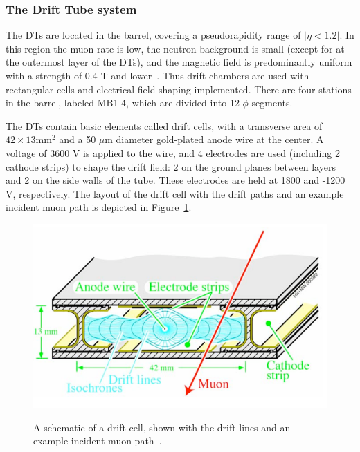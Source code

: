 \subsubsection{The Drift Tube system}
\label{dts}

The DTs are located in the barrel, covering a pseudorapidity range of $|\eta < 1.2|$.  In this region the muon rate is low, the neutron background is small (except for at the outermost layer of the DTs), and the magnetic field is predominantly uniform with a strength of 0.4 T and lower~\cite{CMSperformance}.  Thus drift chambers are used with rectangular cells and electrical field shaping implemented.  There are four stations in the barrel, labeled MB1-4, which are divided into 12 $\phi$-segments.  

The DTs contain basic elements called drift cells, with a transverse area of $42 \times 13 \text{mm}^2$ and a 50 $\mu$m diameter gold-plated anode wire at the center.  A voltage of 3600 V is applied to the wire, and 4 electrodes are used (including 2 cathode strips) to shape the drift field: 2 on the ground planes between layers and 2 on the side walls of the tube.  These electrodes are held at 1800 and -1200 V, respectively.  The layout of the drift cell with the drift paths and an example incident muon path is depicted in Figure~\ref{figapp:DTlayout}.



\begin{figure}[!Hh]
       \includegraphics[scale=0.6]{Figures/DTlayout.png} \\
       \caption[The layout of drift cell of the drift tube system.]{A schematic of a drift cell, shown with the drift lines and an example incident muon path~\cite{CMSdetector}.}
\label{figapp:DTlayout}
\end{figure}

